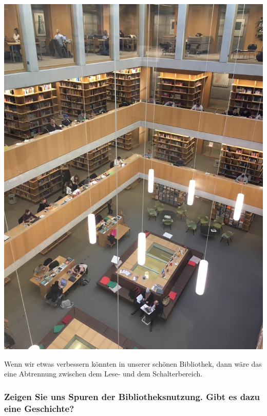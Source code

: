 \begin{center}
\includegraphics{fhs-st-gallen/img/bibliothek.jpg}
\end{center}

Wenn wir etwas verbessern könnten in unserer schönen Bibliothek, dann
wäre das eine Abtrennung zwischen dem Lese- und dem Schalterbereich.

\hypertarget{zeigen-sie-uns-spuren-der-bibliotheksnutzung.-gibt-es-dazu-eine-geschichte}{%
\subsubsection*{Zeigen Sie uns Spuren der Bibliotheksnutzung. Gibt es dazu eine
Geschichte?}\label{zeigen-sie-uns-spuren-der-bibliotheksnutzung.-gibt-es-dazu-eine-geschichte}}

